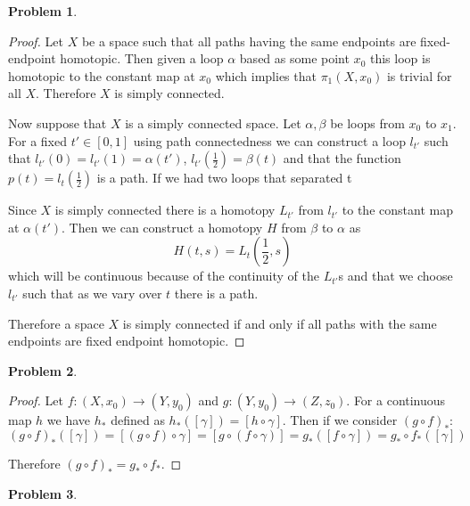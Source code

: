 \documentclass[10pt]{article}
\newcommand{\sk}{\vskip 10mm}
\theoremstyle{plain}
\newtheorem{problem}{Problem}
\theoremstyle{remark}
\begin{document}
\begin{problem}
  
\end{problem} %

\begin{proof}
  Let $X$ be a space such that all paths having the same endpoints are fixed-endpoint
  homotopic. Then given a loop $\alpha$ based as some point $x_0$ this loop is homotopic
  to the constant map at $x_0$ which implies that $\pi_1(X,x_0)$ is trivial for all
  $X$. Therefore $X$ is simply connected.

  Now suppose that $X$ is a simply connected space. Let $\alpha,\beta$ be loops from $x_0$ to
  $x_1$. For a fixed $t'\in [0,1]$ using path connectedness we can construct a loop
  $l_{t'}$ such that $l_{t'}(0)=l_{t'}(1)=\alpha(t')$, $l_{t'}(\frac{1}{2})=\beta(t)$ and
  that the function $p(t)=l_{t}(\frac{1}{2})$ is a path.
  If we had two loops that separated t


  Since $X$ is simply connected there is a homotopy $L_{t'}$ from $l_{t'}$ to the
  constant map at $\alpha(t')$. Then we can construct a homotopy $H$ from $\beta$ to $\alpha$ as
  \[ H(t,s)= L_t(\frac{1}{2},s) \]
  which will be continuous because of the continuity of the $L_{t'}$s and that
  we choose $l_{t'}$ such that as we vary over $t$ there is a path.

  Therefore a space $X$ is simply connected if and only if all paths with the same
  endpoints are fixed endpoint homotopic.
\end{proof}

\sk

\begin{problem} %
  
\end{problem}

\begin{proof}
  Let $f:(X,x_0)\rightarrow (Y,y_0)$ and $g:(Y,y_0)\rightarrow (Z,z_0)$. For a continuous map
  $h$ we have $h_*$ defined as $h_*([\gamma])=[h\circ \gamma]$. Then if we consider
  $(g\circ f)_*$:
  \[ (g\circ f)_*([\gamma]) = [(g\circ f)\circ \gamma] = [g\circ (f\circ \gamma)] = g_*([f\circ \gamma])=g_*\circ f_*([\gamma])\]

  Therefore $(g\circ f)_*=g_*\circ f_*$.
\end{proof}

\sk

\begin{problem} %
  
\end{problem}
\end{document}
